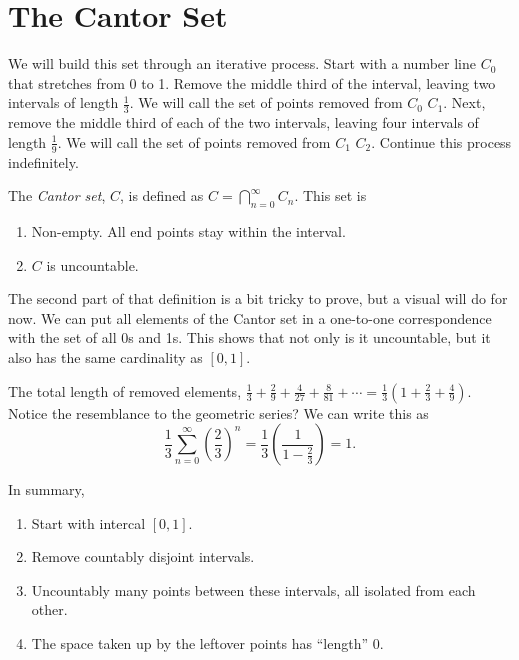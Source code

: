 \section{The Cantor Set}

We will build this set through an iterative process. Start with a number line \(C_0\) that stretches from 0 to 1. Remove the middle third of the interval, leaving two intervals of length \(\frac{1}{3}\). We will call the set of points removed from \(C_0\) \(C_1\). Next, remove the middle third of each of the two intervals, leaving four intervals of length \(\frac{1}{9}\). We will call the set of points removed from \(C_1\) \(C_2\). Continue this process indefinitely.


\begin{definition}
    The \textit{Cantor set}, \(C\), is defined as \(C = \bigcap_{n=0}^\infty C_n\). This set is
    \begin{enumerate}
        \item Non-empty. All end points stay within the interval.
        \item \(C\) is uncountable.
    \end{enumerate}
\end{definition}

The second part of that definition is a bit tricky to prove, but a visual will do for now. We can put all elements of the Cantor set in a one-to-one correspondence with the set of all 0s and 1s. This shows that not only is it uncountable, but it also has the same cardinality as \([0,1]\). %

The total length of removed elements, \(\frac{1}{3} + \frac{2}{9} + \frac{4}{27} + \frac{8}{81} + \cdots = \frac{1}{3}(1 + \frac{2}{3} + \frac{4}{9})\). Notice the resemblance to the geometric series? We can write this as \[\frac{1}{3} \sum_{n=0}^\infty \left(\frac{2}{3}\right)^n = \frac{1}{3} \left(\frac{1}{1 - \frac{2}{3}}\right) = 1.\]

In summary, \begin{enumerate}
    \item Start with intercal \([0,1]\).
    \item Remove countably disjoint intervals.
    \item Uncountably many points between these intervals, all isolated from each other.
    \item The space taken up by the leftover points has ``length'' 0.
\end{enumerate}

